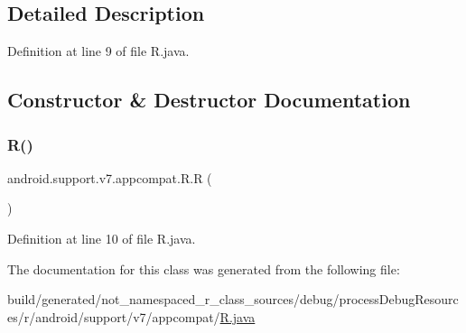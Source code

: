 \subsection{Detailed Description}


Definition at line 9 of file R.\+java.



\subsection{Constructor \& Destructor Documentation}
\mbox{\label{classandroid_1_1support_1_1v7_1_1appcompat_1_1_r_a1f2b7247035e93db2996bdfd46e318ae}} 
\subsubsection{\texorpdfstring{R()}{R()}}
{\footnotesize\ttfamily android.\+support.\+v7.\+appcompat.\+R.\+R (\begin{DoxyParamCaption}{ }\end{DoxyParamCaption})\hspace{0.3cm}{\ttfamily [private]}}



Definition at line 10 of file R.\+java.


\begin{DoxyCode}{0}

\end{DoxyCode}


The documentation for this class was generated from the following file\+:\begin{DoxyCompactItemize}
\item 
build/generated/not\+\_\+namespaced\+\_\+r\+\_\+class\+\_\+sources/debug/process\+Debug\+Resources/r/android/support/v7/appcompat/\mbox{\hyperlink{android_2support_2v7_2appcompat_2_r_8java}{R.\+java}}\end{DoxyCompactItemize}
